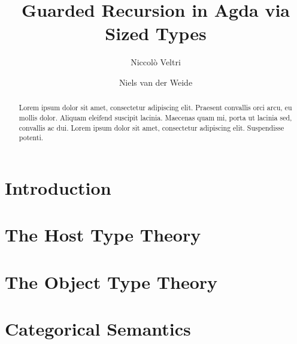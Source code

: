 \documentclass[a4paper,UKenglish,cleveref, autoref,numberwithinsect]{lipics-v2019}
\title{Guarded Recursion in Agda via Sized Types}
\author{Niccol\`o Veltri}{Department of Computer Science, IT
  University of Copenhagen, Denmark}{nive@itu.dk}{https://orcid.org/0000-0002-7230-3436}{This work was supported by a research grant (13156) from VILLUM FONDEN,
  and by DFF-Research Project 1 Grant no. 4002-00442, from The Danish Council 
  for Independent Research for the Natural Sciences (FNU).}
\author{Niels van der Weide}{Institute for Computation and Information Sciences, Radboud University, Nijmegen, The Netherlands}{nweide@cs.ru.nl}{https://orcid.org/0000-0003-1146-4161}{}
\begin{document}
\maketitle

\begin{abstract}
Lorem ipsum dolor sit amet, consectetur adipiscing elit. Praesent convallis orci arcu, eu mollis dolor. Aliquam eleifend suscipit lacinia. Maecenas quam mi, porta ut lacinia sed, convallis ac dui. Lorem ipsum dolor sit amet, consectetur adipiscing elit. Suspendisse potenti. 
 \end{abstract}

\section{Introduction}
\label{sec:intro}


\section{The Host Type Theory}
\label{sec:prelim}



\section{The Object Type Theory}
\label{sec:syntax}



\section{Categorical Semantics}
\end{document}
